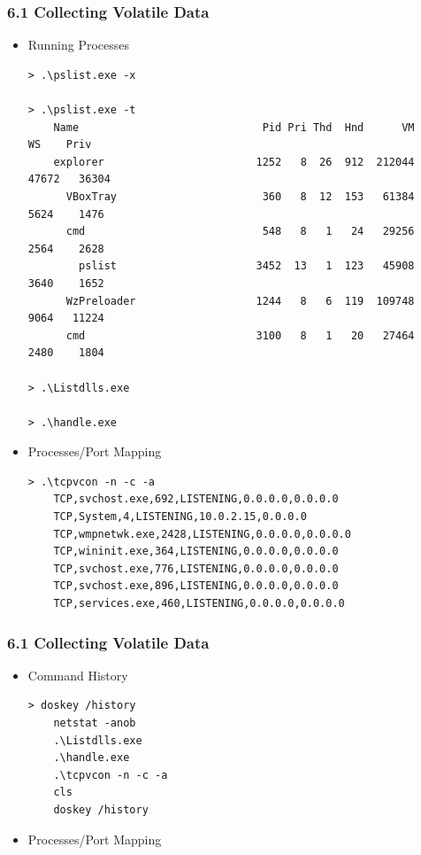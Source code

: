 \begin{frame}[fragile]
  \frametitle{6.1 Collecting Volatile Data}
  \begin{itemize}
        \item Running Processes
\begin{lstlisting}[basicstyle=\tiny]
> .\pslist.exe -x

> .\pslist.exe -t
    Name                             Pid Pri Thd  Hnd      VM      WS    Priv
    explorer                        1252   8  26  912  212044   47672   36304
      VBoxTray                       360   8  12  153   61384    5624    1476
      cmd                            548   8   1   24   29256    2564    2628
        pslist                      3452  13   1  123   45908    3640    1652
      WzPreloader                   1244   8   6  119  109748    9064   11224
      cmd                           3100   8   1   20   27464    2480    1804

> .\Listdlls.exe

> .\handle.exe
\end{lstlisting}
        \item Processes/Port Mapping
\begin{lstlisting}[basicstyle=\tiny]
> .\tcpvcon -n -c -a
    TCP,svchost.exe,692,LISTENING,0.0.0.0,0.0.0.0
    TCP,System,4,LISTENING,10.0.2.15,0.0.0.0
    TCP,wmpnetwk.exe,2428,LISTENING,0.0.0.0,0.0.0.0
    TCP,wininit.exe,364,LISTENING,0.0.0.0,0.0.0.0
    TCP,svchost.exe,776,LISTENING,0.0.0.0,0.0.0.0
    TCP,svchost.exe,896,LISTENING,0.0.0.0,0.0.0.0
    TCP,services.exe,460,LISTENING,0.0.0.0,0.0.0.0
\end{lstlisting}
    \end{itemize}
\end{frame}


\begin{frame}[fragile]
  \frametitle{6.1 Collecting Volatile Data}
  \begin{itemize}
        \item Command History
\begin{lstlisting}[basicstyle=\tiny]
> doskey /history
    netstat -anob
    .\Listdlls.exe
    .\handle.exe
    .\tcpvcon -n -c -a
    cls
    doskey /history
\end{lstlisting}
        \item Processes/Port Mapping
\begin{lstlisting}[basicstyle=\tiny]

\end{lstlisting}
    \end{itemize}
\end{frame}



